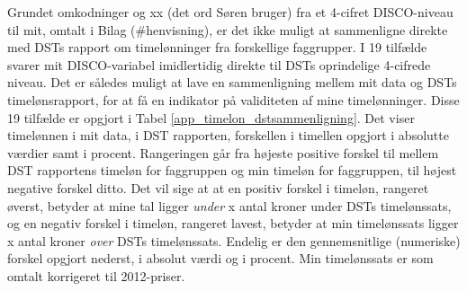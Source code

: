 Grundet omkodninger og xx (det ord Søren bruger) fra et 4-cifret DISCO-niveau til mit, omtalt i Bilag (\#henvisning), er det ikke muligt at sammenligne direkte med DSTs rapport om timelønninger fra forskellige faggrupper. I 19 tilfælde svarer mit DISCO-variabel imidlertidig direkte til DSTs oprindelige 4-cifrede niveau. Det er således muligt at lave en sammenligning mellem mit data og DSTs timelønsrapport, for at få en indikator på validiteten af mine timelønninger. Disse 19 tilfælde er opgjort i Tabel \ref{app_timelon_dstsammenligning}. Det viser timelønnen i mit data, i DST rapporten, forskellen i timellen opgjort i absolutte værdier samt i procent. Rangeringen går fra højeste positive forskel til mellem DST rapportens timeløn for faggruppen og min timeløn for faggruppen, til højest negative forskel ditto. Det vil sige at at en positiv forskel i timeløn, rangeret øverst, betyder at mine tal ligger \emph{under} x antal kroner under DSTs timelønssats, og en negativ forskel i timeløn, rangeret lavest, betyder at min timelønssats ligger x antal kroner \emph{over} DSTs timelønssats. Endelig er den gennemsnitlige (numeriske) forskel opgjort nederst, i absolut værdi og i procent. Min timelønssats er som omtalt korrigeret til 2012-priser. 

